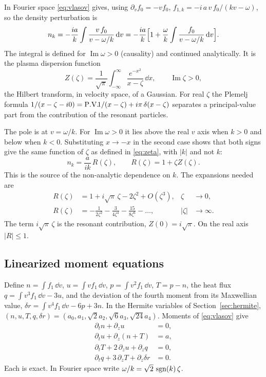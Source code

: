 In Fourier space \eqref{eq:vlasov} gives, using $\partial_vf_0=-vf_0$,
$f_{1,k}=-i\,a\,v\,f_0/(kv-\omega)$, so the density perturbation is
\[
  n_k=-\frac{ia}{k}\int\frac{v\,f_0}{v-\omega/k}\,\mathrm{d} v
     =-\frac{ia}{k}\Bigl[1+\frac\omega k\int\frac{f_0}{v-\omega/k}\,\mathrm{d} v\Bigr].
\]
The integral is defined for $\operatorname{Im}\omega>0$ (causality) and
continued analytically. It is the plasma dispersion function
\begin{equation}
  Z(\zeta)=\frac1{\sqrt\pi}\int_{-\infty}^{\infty}\frac{e^{-x^2}}{x-\zeta}\,\dd x,
  \qquad\operatorname{Im}\zeta>0,
  \label{eq:Z}
\end{equation}
the Hilbert transform, in velocity space, of a Gaussian. For real $\zeta$
the Plemelj formula
$1/(x-\zeta-i0)=\mathrm{P.V.}\!\!\,1/(x-\zeta)+i\pi\,\delta(x-\zeta)$ separates a
principal-value part from the contribution of the resonant particles.

The pole is at $v=\omega/k$. For $\operatorname{Im}\omega>0$ it lies above
the real $v$ axis when $k>0$ and below when $k<0$. Substituting $x\to-x$ in
the second case shows that both signs give the same function of $\zeta$ as
defined in \eqref{eq:zeta}, with $|k|$ and not $k$:
\begin{equation}
  n_k=\frac{a}{ik}\,R(\zeta),\qquad R(\zeta)=1+\zeta Z(\zeta).
  \label{eq:R}
\end{equation}
This is the source of the non-analytic dependence on $k$. The expansions
needed are
\begin{align}
  R(\zeta)&=1+i\sqrt\pi\,\zeta-2\zeta^2+O(\zeta^3), &\zeta&\to0,
     \label{eq:Rsmall}\\
  R(\zeta)&=-\frac1{2\zeta^2}-\frac3{4\zeta^4}-\frac{15}{8\zeta^6}-\dots,
     &|\zeta|&\to\infty. \label{eq:Rlarge}
\end{align}
The term $i\sqrt\pi\,\zeta$ is the resonant contribution,
$Z(0)=i\sqrt\pi$. On the real axis $|R|\le1$.

\subsection{Linearized moment equations}

Define $n=\int f_1\,\dd v$, $u=\int vf_1\,\dd v$, $p=\int v^2f_1\,\dd v$,
$T=p-n$, the heat flux $q=\int v^3f_1\,\dd v-3u$, and the deviation of the
fourth moment from its Maxwellian value,
$\delta r=\int v^4f_1\,\dd v-6p+3n$. In the Hermite variables of
Section~\ref{sec:hermite}, $(n,u,T,q,\delta r)
=(a_0,a_1,\sqrt2a_2,\sqrt6a_3,\sqrt{24}a_4)$. Moments of \eqref{eq:vlasov}
give
\begin{align}
  \partial_tn+\partial_zu&=0, \label{eq:n}\\
  \partial_tu+\partial_z(n+T)&=a, \label{eq:u}\\
  \partial_tT+2\,\partial_zu+\partial_zq&=0, \label{eq:T}\\
  \partial_tq+3\,\partial_zT+\partial_z\delta r&=0. \label{eq:q}
\end{align}
Each is exact. In Fourier space write
$\omega/k=\sqrt2\,\operatorname{sgn}(k)\,\zeta$.

